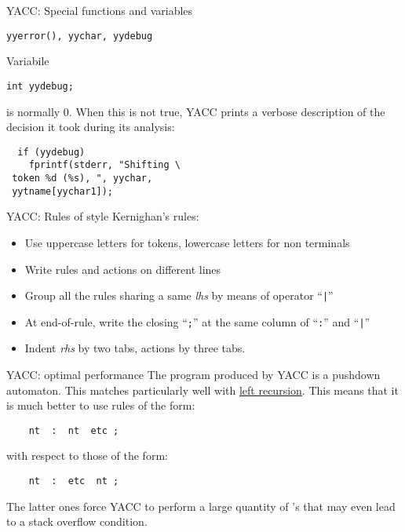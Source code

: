 \begin{frame}[fragile]{YACC: Special functions and variables}
\begin{center}\tt yyerror(), yychar, yydebug\end{center}
Variabile 
\begin{center}
{\tt int yydebug;}
\end{center}
is normally 0. When this is not true, YACC prints a verbose description
of the decision it took during its analysis:

\begin{verbatim}
  if (yydebug)
    fprintf(stderr, "Shifting \
 token %d (%s), ", yychar, 
 yytname[yychar1]);
\end{verbatim}



\end{frame}
\begin{frame}[fragile]{YACC: Rules of style}
Kernighan's rules:
\begin{itemize}
\item Use uppercase letters for tokens, lowercase letters for non terminals
\item Write rules and actions on different lines
\item Group all the rules sharing a same {\em lhs\/} by means of operator
``\verb"|"''
\item At end-of-rule, write the closing ``{\tt ;}'' at the same column of
``\verb":"'' and ``\verb"|"''
\item Indent {\em rhs\/} by two tabs, actions by three tabs.
\end{itemize}






\end{frame}
\begin{frame}[fragile]{YACC: optimal performance}
The program produced by YACC is a pushdown automaton.
This matches particularly well with 
\underline{left recursion}. This means that it is much better
to use rules of the form:


\vspace{20pt}

\verb"    nt  :  nt  etc ; "

\vspace{20pt}


with respect to those of the form:

\vspace{20pt}


\verb"    nt  :  etc  nt ; "


\vspace{20pt}

The latter ones force YACC to perform a large quantity of \shift{}'s that
may even lead to a stack overflow condition.

\end{frame}
